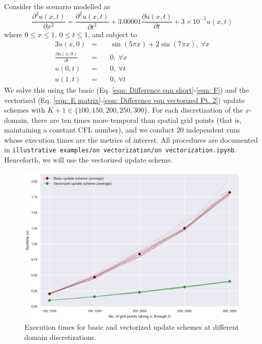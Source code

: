 \documentclass{article}
\begin{document}
Consider the scenario modelled as
\begin{equation}
   \label{eqn: Telegraph eqn for On Vectorization}
   \frac{\partial^{2} u \left(x,t\right)}{\partial x^{2}}
   =
   \frac{\partial^{2} u \left(x,t\right)}{\partial t^{2}}
   +
   3.00001 \frac{\partial u \left(x,t\right)}{\partial t}
   +
   3 \times 10^{-5} u \left(x,t\right)
\end{equation}
where $0 \leq x \leq 1$, $0 \leq t \leq 1$,
and subject to
\begin{alignat}{3}
   \label{eqn: mu for On Vectorization}
   u \left(x,0\right) &=\ && \sin \left(5 \pi x\right) + 2 \sin \left(7 \pi x\right),\ \forall x \\
   \label{eqn: xi for On Vectorization}
   \frac{\partial u \left(x,0\right)}{\partial t} &=\ && 0,\ \forall x \\
   \label{eqn: nu_0 for On Vectorization}
   u \left(0,t\right) &=\ && 0,\ \forall t \\
   \label{eqn: nu_X for On Vectorization}
   u \left(1,t\right) &=\ && 0,\ \forall t
\end{alignat}
We solve this using the basic (Eq. \ref{eqn: Difference eqn short}-\ref{eqn: F})
and the vectorized (Eq. \ref{eqn: E matrix}-\ref{eqn: Difference eqn vectorized Pt. 2}) update schemes
with $K+1 \in \{100,150,200,250,300\}$.
For each discretization of the $x$-domain, there are ten times more temporal than spatial grid points
(that is, maintaining a constant CFL number),
and we conduct 20 independent runs whose execution times are the metrics of interest.
All procedures are documented in
{\tt illustrative examples/on vectorization/on vectorization.ipynb}.
Henceforth, we will use the vectorized update scheme.

\begin{figure}[t!]
   \centering
   \includegraphics[scale=0.75]{on vectorization.png}
   \caption{Execution times for basic and vectorized update schemes at different domain discretizations.}
	\label{fig: On Vectorization results}
\end{figure}
\end{document}
